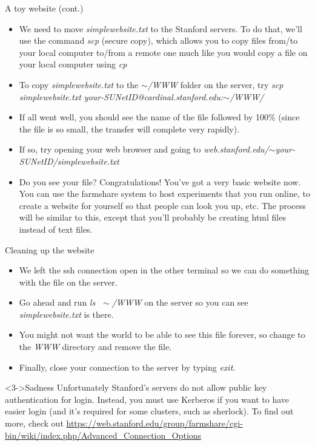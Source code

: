 \documentclass{beamer}
\begin{document}
\begin{frame}{A toy website (cont.)}
\begin{itemize}
    \item<1-> We need to move \emph{simplewebsite.txt} to the Stanford servers. To do that, we'll use the command \emph{scp} (secure copy), which allows you to copy files from/to your local computer to/from a remote one much like you would copy a file on your local computer using \emph{cp} 
    \item<2-> To copy \emph{simplewebsite.txt} to the \emph{$\sim$/WWW} folder on the server, try \emph{scp simplewebsite.txt your-SUNetID@cardinal.stanford.edu:$\sim$/WWW/} 
    \item<3-> If all went well, you should see the name of the file followed by 100\% (since the file is so small, the transfer will complete very rapidly). 
    \item<3-> If so, try opening your web browser and going to \emph{web.stanford.edu/$\sim$your-SUNetID/simplewebsite.txt} 
    \item<4-> Do you see your file? Congratulations! You've got a very basic website now. You can use the farmshare system to host experiments that you run online, to create a website for yourself so that people can look you up, etc. The process will be similar to this, except that you'll probably be creating html files instead of text files. 
\end{itemize}
\end{frame}

\begin{frame}{Cleaning up the website}
\begin{itemize}
    \item<1-> We left the ssh connection open in the other terminal so we can do something with the file on the server.
    \item<2-> Go ahead and run \emph{ls $\;\sim$/WWW} on the server so you can see \emph{simplewebsite.txt} is there.
    \item<3-> You might not want the world to be able to see this file forever, so change to the \emph{WWW} directory and remove the file.
    \item<4-> Finally, close your connection to the server by typing \emph{exit}.
\end{itemize}
\begin{alertblock}<3->{Sadness}
Unfortunately Stanford's servers do not allow public key authentication for login. Instead, you must use Kerberos if you want to have easier login (and it's required for some clusters, such as sherlock). To find out more, check out {\color{blue} \url{https://web.stanford.edu/group/farmshare/cgi-bin/wiki/index.php/Advanced_Connection_Options}} 
\end{alertblock}
\end{frame}
\end{document}
